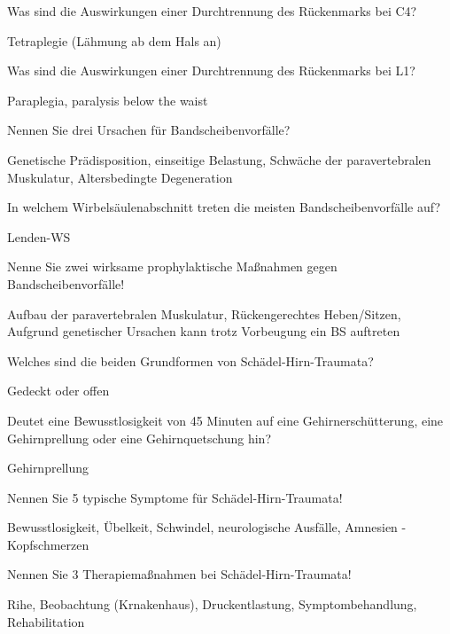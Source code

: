 \documentclass[10pt, a4paper]{exam}
\begin{document}
\begin{questions}
  \question Was sind die Auswirkungen einer Durchtrennung des Rückenmarks bei C4?
  \begin{solution}
    Tetraplegie (Lähmung ab dem Hals an)
  \end{solution}

  \question Was sind die Auswirkungen einer Durchtrennung des Rückenmarks bei L1?
  \begin{solution}
    Paraplegia, paralysis below the waist
  \end{solution}

  \question Nennen Sie drei Ursachen für Bandscheibenvorfälle?
  \begin{solution}
    Genetische Prädisposition, einseitige Belastung, Schwäche der paravertebralen Muskulatur, Altersbedingte Degeneration
  \end{solution}

  \question In welchem Wirbelsäulenabschnitt treten die meisten Bandscheibenvorfälle auf?
  \begin{solution}
    Lenden-WS
  \end{solution}

  \question Nenne Sie zwei wirksame prophylaktische Maßnahmen gegen Bandscheibenvorfälle!
  \begin{solution}
    Aufbau der paravertebralen Muskulatur, Rückengerechtes Heben/Sitzen, Aufgrund genetischer Ursachen kann trotz Vorbeugung ein BS auftreten
  \end{solution}

  \question Welches sind die beiden Grundformen von Schädel-Hirn-Traumata?
  \begin{solution}
    Gedeckt oder offen
  \end{solution}

  \question Deutet eine Bewusstlosigkeit von 45 Minuten auf eine Gehirnerschütterung, eine Gehirnprellung oder eine Gehirnquetschung hin?
  \begin{solution}
    Gehirnprellung
  \end{solution}

  \question Nennen Sie 5 typische Symptome für Schädel-Hirn-Traumata!
  \begin{solution}
    Bewusstlosigkeit, Übelkeit, Schwindel, neurologische Ausfälle, Amnesien
    - Kopfschmerzen
  \end{solution}

  \question Nennen Sie 3 Therapiemaßnahmen bei Schädel-Hirn-Traumata!
  \begin{solution}
    Rihe, Beobachtung (Krnakenhaus), Druckentlastung, Symptombehandlung, Rehabilitation
  \end{solution}


\end{questions}
\end{document}
